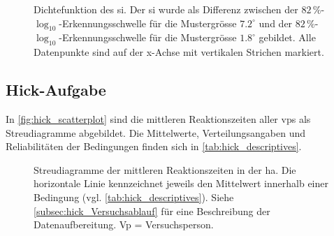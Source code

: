 \documentclass[11pt, twoside, a4paper]{book}		%
\begin{document}
\begin{figure}[htbp]
	\centering
	\begin{adjustbox}{width=1\textwidth}
		
	\end{adjustbox}
	\caption[Dichtefunktion des \gls{si}]{Dichtefunktion des \gls{si}. Der \gls{si} wurde als Differenz zwischen der $82\,\%$-$\log_{10}$-Er\-ken\-nungs\-schwel\-le für die Mustergrösse $7.2^{\circ}$ und der $82\,\%$-$\log_{10}$-Er\-ken\-nungs\-schwel\-le für die Mustergrösse $1.8^{\circ}$ gebildet. Alle Datenpunkte sind auf der x-Achse mit vertikalen Strichen markiert.}
	\label{fig:suppression_index_density}
\end{figure}

\subsection{Hick-Aufgabe}

In \autoref{fig:hick_scatterplot} sind die mittleren Reaktionszeiten aller \glspl{vp} als Streudiagramme abgebildet.
Die Mittelwerte, Verteilungsangaben und Reliabilitäten der Bedingungen finden sich in \autoref{tab:hick_descriptives}. 

\begin{figure}[p]
	\centering
	\begin{adjustbox}{width=1\textwidth}
		
	\end{adjustbox}
	\caption[Streudiagramme der Reaktionszeiten in der \gls{ha}]{Streudiagramme der mittleren Reaktionszeiten in der \gls{ha}. Die horizontale Linie kennzeichnet jeweils den Mittelwert innerhalb einer Bedingung (vgl. \autoref{tab:hick_descriptives}). Siehe \autoref{subsec:hick_Versuchsablauf} für eine Beschreibung der Datenaufbereitung. Vp = Versuchsperson.}
	\label{fig:hick_scatterplot}
\end{figure}
\end{document}
